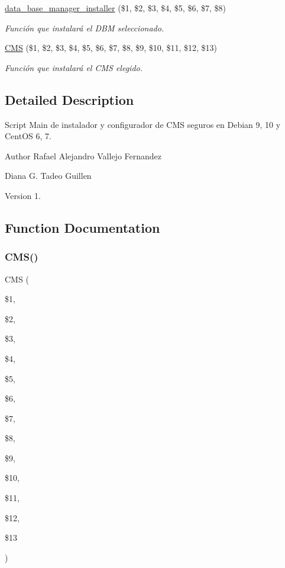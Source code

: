 \begin{DoxyCompactItemize}
\hyperlink{main_8sh_a1978233bd26781aa3df0b7e9ed3cf567}{data\+\_\+base\+\_\+manager\+\_\+installer} (\$1, \$2, \$3, \$4, \$5, \$6, \$7, \$8)
\begin{DoxyCompactList}\small\item\em Función que instalará el D\+BM seleccionado. \end{DoxyCompactList}\item 
\hyperlink{main_8sh_ad12ec286dbd629bd87a02fde36e82f94}{C\+MS} (\$1, \$2, \$3, \$4, \$5, \$6, \$7, \$8, \$9, \$10, \$11, \$12, \$13)
\begin{DoxyCompactList}\small\item\em Función que instalará el C\+MS elegido. \end{DoxyCompactList}\end{DoxyCompactItemize}


\subsection{Detailed Description}
Script Main de instalador y configurador de C\+MS seguros en Debian 9, 10 y Cent\+OS 6, 7. 

\begin{DoxyAuthor}{Author}
Rafael Alejandro Vallejo Fernandez 

Diana G. Tadeo Guillen 
\end{DoxyAuthor}
\begin{DoxyVersion}{Version}
1. 
\end{DoxyVersion}


\subsection{Function Documentation}
\mbox{\label{main_8sh_ad12ec286dbd629bd87a02fde36e82f94}} 
\subsubsection{\texorpdfstring{C\+M\+S()}{CMS()}}
{\footnotesize\ttfamily C\+MS (\begin{DoxyParamCaption}\item[{}]{\$1,  }\item[{}]{\$2,  }\item[{}]{\$3,  }\item[{}]{\$4,  }\item[{}]{\$5,  }\item[{}]{\$6,  }\item[{}]{\$7,  }\item[{}]{\$8,  }\item[{}]{\$9,  }\item[{}]{\$10,  }\item[{}]{\$11,  }\item[{}]{\$12,  }\item[{}]{\$13 }\end{DoxyParamCaption})}



